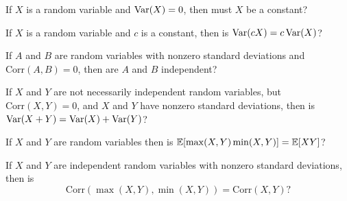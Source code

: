 \documentclass[11pt]{article}
\begin{document}
\begin{Parts}[resume]
	
	\Part If $X$ is a random variable and $\operatorname{Var} (X) = 0$, then must $X$ be a 
	constant?

	\Part If $X$ is a random variable and $c$ is a constant, then is $\operatorname{Var}(cX) 
	= c \operatorname{Var}(X)$?
	
	\Part If $A$ and $B$ are random variables with nonzero standard deviations 
	and $\text{Corr} (A, B) = 0$, then are $A$ and $B$ independent?

	\Part If $X$ and $Y$ are not necessarily independent random variables, but 
	$\text{Corr} (X, Y) = 0$, and $X$ and $Y$ have nonzero standard deviations,
	then is $\operatorname{Var} (X+Y) = \operatorname{Var}(X) + \operatorname{Var}(Y)$?
	
	\Part If $X$ and $Y$ are random variables then is $\operatorname{\mathbb{E}}[\max (X, Y) \min (X, 
	Y)] = \operatorname{\mathbb{E}}[X Y]$?
	
	\Part If $X$ and $Y$ are independent random variables with nonzero standard 
	deviations, then is $$\text{Corr}(\max(X, Y), \min(X, Y)) = \text{Corr}(X, 
	Y)?$$
	
\end{Parts}
\end{document}
